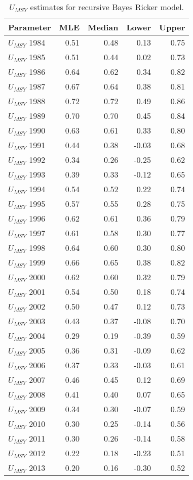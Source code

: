 \begin{table}[ht]
\centering
\caption{$U_{MSY}$ estimates for recursive Bayes Ricker model.} 
\label{estumsy}
\begin{tabular}{lrrrr}
  \hline
Parameter & MLE & Median & Lower & Upper \\ 
  \hline
$U_{MSY}$ 1984 & 0.51 & 0.48 & 0.13 & 0.75 \\ 
  $U_{MSY}$ 1985 & 0.51 & 0.44 & 0.02 & 0.73 \\ 
  $U_{MSY}$ 1986 & 0.64 & 0.62 & 0.34 & 0.82 \\ 
  $U_{MSY}$ 1987 & 0.67 & 0.64 & 0.38 & 0.81 \\ 
  $U_{MSY}$ 1988 & 0.72 & 0.72 & 0.49 & 0.86 \\ 
  $U_{MSY}$ 1989 & 0.70 & 0.70 & 0.45 & 0.84 \\ 
  $U_{MSY}$ 1990 & 0.63 & 0.61 & 0.33 & 0.80 \\ 
  $U_{MSY}$ 1991 & 0.44 & 0.38 & -0.03 & 0.68 \\ 
  $U_{MSY}$ 1992 & 0.34 & 0.26 & -0.25 & 0.62 \\ 
  $U_{MSY}$ 1993 & 0.39 & 0.33 & -0.12 & 0.65 \\ 
  $U_{MSY}$ 1994 & 0.54 & 0.52 & 0.22 & 0.74 \\ 
  $U_{MSY}$ 1995 & 0.57 & 0.55 & 0.28 & 0.75 \\ 
  $U_{MSY}$ 1996 & 0.62 & 0.61 & 0.36 & 0.79 \\ 
  $U_{MSY}$ 1997 & 0.61 & 0.58 & 0.30 & 0.77 \\ 
  $U_{MSY}$ 1998 & 0.64 & 0.60 & 0.30 & 0.80 \\ 
  $U_{MSY}$ 1999 & 0.66 & 0.65 & 0.38 & 0.82 \\ 
  $U_{MSY}$ 2000 & 0.62 & 0.60 & 0.32 & 0.79 \\ 
  $U_{MSY}$ 2001 & 0.54 & 0.50 & 0.18 & 0.74 \\ 
  $U_{MSY}$ 2002 & 0.50 & 0.47 & 0.12 & 0.73 \\ 
  $U_{MSY}$ 2003 & 0.43 & 0.37 & -0.08 & 0.70 \\ 
  $U_{MSY}$ 2004 & 0.29 & 0.19 & -0.39 & 0.59 \\ 
  $U_{MSY}$ 2005 & 0.36 & 0.31 & -0.09 & 0.62 \\ 
  $U_{MSY}$ 2006 & 0.37 & 0.33 & -0.03 & 0.61 \\ 
  $U_{MSY}$ 2007 & 0.46 & 0.45 & 0.12 & 0.69 \\ 
  $U_{MSY}$ 2008 & 0.41 & 0.40 & 0.07 & 0.65 \\ 
  $U_{MSY}$ 2009 & 0.34 & 0.30 & -0.07 & 0.59 \\ 
  $U_{MSY}$ 2010 & 0.30 & 0.25 & -0.14 & 0.56 \\ 
  $U_{MSY}$ 2011 & 0.30 & 0.26 & -0.14 & 0.58 \\ 
  $U_{MSY}$ 2012 & 0.22 & 0.18 & -0.23 & 0.51 \\ 
  $U_{MSY}$ 2013 & 0.20 & 0.16 & -0.30 & 0.52 \\ 
   \hline
\end{tabular}
\end{table}
